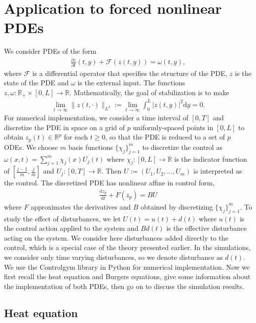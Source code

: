 \documentclass[letterpaper, 10 pt, conference]{ieeeconf}  %
\newcommand{\R}{\mathbb{R}}
\newcommand{\ud}{\mathrm{d}}
\begin{document}
\section{Application to forced nonlinear PDEs}
\label{sec:pde}
We consider PDEs of the form
\begin{align*}
    \frac{\partial z}{\partial t}(t,y) + \mathcal{F}(z(t,y)) = \omega(t,y),
\end{align*}
where $\mathcal{F}$ is a differential operator that specifies the structure of the PDE, $z$ is the state of the PDE and $\omega$ is the external input. The functions $z, \omega : \R_+ \times [0,L] \to \R$. Mathematically, the goal of stabilization is to make 
\begin{align}\label{eq:L2objective}
\lim_{t \to \infty}\|z(t,\cdot)\|_{L^2} := \lim_{t \to \infty}\int_{0}^{L} |z(t,y)|^2 \ud y = 0.    
\end{align}
For numerical implementation, we consider a time interval of $[0,T]$ and discretize the PDE in space on a grid of $p$ uniformly-spaced points in $[0,L]$ to obtain $z_p(t) \in \R^p$ for each $t \ge 0$, so that the PDE is reduced to a set of $p$ ODEs. We choose $m$ basis functions $\{\chi_j\}_{j=1}^{m}$ to discretize the control as 
$\omega(x,t) = \sum_{j=1}^m \chi_j(x) U_j(t)$ where $\chi_j : [0,L] \to \R$ is the indicator function of $[\frac{j-1}{m},\frac{j}{m}]$ and $U_j : [0,T] \to \R$. 
Then $U := (U_1,U_2,\ldots,U_m)$ is interpreted as the control. The discretized PDE has nonlinear affine in control form,
\begin{align}
\frac{\ud z_p}{\ud t} + F(z_p) = BU
\label{eq:discrete-pde}
\end{align}
where $F$ approximates the derivatives and $B$ obtained by discretizing $\{\chi_j\}_{j=1}^{m}$. To study the effect of disturbances, we let $U(t) = u(t) + d(t)$ where $u(t)$ is the control action applied to the system and $Bd(t)$ is the effective disturbance acting on the system. We consider here disturbances added directly to the control, which is a special case of the theory presented earlier. In the simulations, we consider only time varying disturbances, so we denote disturbance as $d(t)$. 
We use the Controlgym library in Python \cite{zhang2023controlgym} for numerical implementation. 
Now we first recall the heat equation and Burgers equations, give some information about the implementation of both PDEs, then go on to discuss the simulation results.
\subsection{Heat equation}
\end{document}
